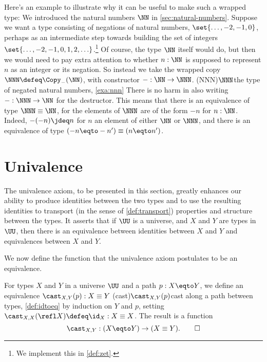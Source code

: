 \begin{example}\label{exa:nnn}
Here's an example to illustrate why it can be useful to make such a wrapped type:
We introduced the natural numbers $\NN$ in \cref{sec:natural-numbers}.
Suppose we want a type consisting of negations of natural numbers,
$\set{\ldots, -2, -1,0}$,
perhaps as an intermediate step towards building the set of integers
$\set{\ldots, -2, -1,0,1,2,\ldots}$.\footnote{%
  We implement this in \cref{def:zet}.}
Of course, the type $\NN$ itself would do,
but then we would need to pay extra attention to whether $n:\NN$
is supposed to represent $n$ as an integer or its negation.
So instead we take the wrapped copy $\NNN\defeq\Copy_{-}(\NN)$,
with constructor ${-} : \NN \to \NNN$.%
\glossary(NNN){$\protect\NNN$}{the type of negated natural numbers,
  \cref{exa:nnn}}
There is no harm in also writing ${-} : \NNN \to \NN$
for the destructor.
This means that there is an equivalence of type $\NNN \equiv \NN$, for
the elements of $\NNN$ are of the form $-n$ for $n:\NN$.
Indeed, $-(-n) \jdeq n$ for $n$ an element of either $\NN$ or $\NNN$,
and there is an equivalence of type $(-n \eqto -n') \equiv (n \eqto n')$.
\end{example}

\section{Univalence}\label{sec:univax}

The univalence axiom, to be presented in this section, greatly enhances our ability to produce identities between the two types and to use the
resulting identities to transport (in the sense of \cref{def:transport}) properties and structure between the types.  It asserts that if $\UU$
is a universe, and $X$ and $Y$ are types in $\UU$, then there is an equivalence between identities between $X$ and $Y$ and equivalences between
$X$ and $Y$.

We now define the function that the univalence axiom postulates to be an equivalence.

\begin{definition}\label{def:idtoeq}
  For types $X$ and $Y$ in a universe $\UU$ and a path $p : X \eqto Y$,
  we define an equivalence $\cast_{X,Y} (p) : X\equiv Y$
  \glossary(cast){$\protect\cast_{X,Y} (p)$}{cast along a path between types, \cref{def:idtoeq}}
  by induction on $Y$ and $p$,
  setting $\cast_{X,X} (\refl X) \defeq \id_X : X \equiv X$.
  The result is a function
  \[
    \cast_{X,Y} : (X \eqto Y) \to (X\equiv Y).\qedhere
  \]
\end{definition}

